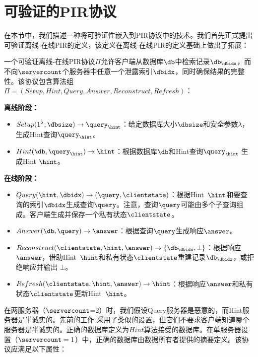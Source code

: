 \section{可验证的PIR协议}
\label{sec:verification}
在本节中，我们描述一种将可验证性嵌入到PIR协议中的技术。我们首先正式提出可验证离线-在线PIR的定义，该定义在离线-在线PIR的定义基础上做出了拓展：

\begin{definition}
    一个可验证离线-在线PIR协议$\Pi$允许客户端从数据库$\db$中检索记录$\db_\dbidx$，而不向$\servercount$个服务器中任意一个泄露索引$\dbidx$，同时确保结果的完整性。该协议包含算法组$\Pi = (Setup, Hint, Query, Answer, Reconstruct, Refresh)$：
    \begin{center}
        \raggedright
        \noindent \textbf{离线阶段：}
        \begin{itemize}
            \item $Setup(1^\lambda,\dbsize) \rightarrow \query_\hint$：给定数据库大小$\dbsize$和安全参数$\lambda$，生成Hint查询$\query_\hint$。
            \item $Hint(\db, \query_\hint) \rightarrow \hint$：根据数据库$\db$和Hint查询$\query_\hint$ 生成Hint $\hint$。
        \end{itemize}
        \noindent \textbf{在线阶段：}
        \begin{itemize}
            \item $Query(\hint, \dbidx) \rightarrow (\query, \clientstate)$：根据Hint~$\hint$和要查询的索引$\dbidx$生成查询$\query$。注意，查询$\query$可能由多个子查询组成。客户端生成并保存一个私有状态$\clientstate$。
            \item $Answer(\db, \query) \rightarrow \answer$：根据查询$\query$生成响应$\answer$。
            \item $Reconstruct(\clientstate, \hint, \answer) \rightarrow \{\db_\dbidx, \bot\}$：根据响应$\answer$，借助Hint~$\hint$和私有状态$\clientstate$重建记录$\db_\dbidx$，或拒绝响应并输出 $\bot$。
            \item $Refresh(\clientstate, \hint, \answer) \rightarrow \hint$：根据响应$\answer$和私有状态$\clientstate$更新Hint~$\hint$。
        \end{itemize}
    \end{center}
    在两服务器（$\servercount$=2）时，我们假设Query服务器是恶意的，而Hint服务器是半诚实的。先前的工作 \cite{APIR} 采用了类似的设置，但它们不要求客户端知道哪个服务器是半诚实的。正确的数据库定义为$Hint$算法接受的数据库。在单服务器设置（$\servercount=1$）中，正确的数据库由数据所有者提供的摘要定义。该协议应满足以下属性：


\end{definition}
